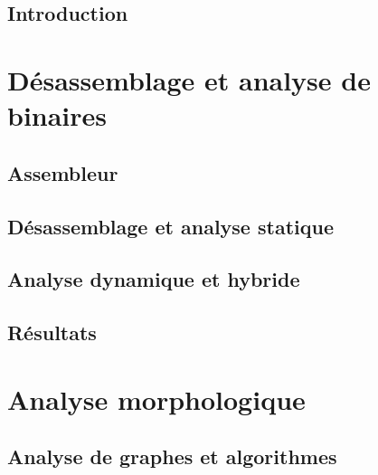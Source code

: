 \documentclass[11pt]{TUL/thesul}
\begin{document}


\NoChapterHead

\DontWriteThisInToc   
\listoffigures


\mainmatter

\DontFrameThisInToc
\NumberThisInToc
\chapter{Introduction}

\part{Désassemblage et analyse de binaires}

\DontFrameThisInToc
\chapter{Assembleur}


\DontFrameThisInToc
\chapter{Désassemblage et analyse statique}
% 

\DontFrameThisInToc
\chapter{Analyse dynamique et hybride}
% 

\DontFrameThisInToc
\chapter{Résultats}
% 

\part{Analyse morphologique}
\DontFrameThisInToc
\chapter{Analyse de graphes et algorithmes}
\end{document}
